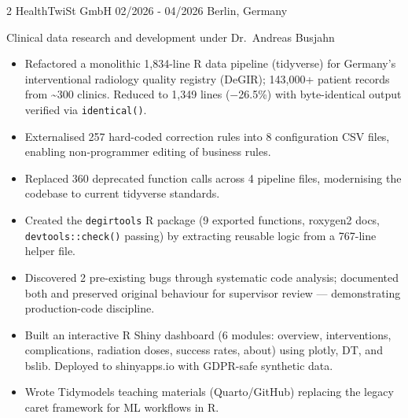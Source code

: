 \documentclass{thejus_cv}
\begin{document}
\begin{paracol}{2}
             {HealthTwiSt GmbH}
             {02/2026 - 04/2026}
             {Berlin, Germany}
             {Clinical data research and development under Dr.~Andreas Busjahn
             \begin{itemize}\setlength{\itemsep}{0.05em}
                   \item Refactored a monolithic 1,834-line R data pipeline (tidyverse) for Germany's interventional radiology quality registry (DeGIR); 143,000+ patient records from \textasciitilde300 clinics. Reduced to 1,349 lines ($-$26.5\%) with byte-identical output verified via \texttt{identical()}.
                   \item Externalised 257 hard-coded correction rules into 8 configuration CSV files, enabling non-programmer editing of business rules.
                   \item Replaced 360 deprecated function calls across 4 pipeline files, modernising the codebase to current tidyverse standards.
                   \item Created the \texttt{degirtools} R package (9 exported functions, roxygen2 docs, \texttt{devtools::check()} passing) by extracting reusable logic from a 767-line helper file.
                   \item Discovered 2 pre-existing bugs through systematic code analysis; documented both and preserved original behaviour for supervisor review --- demonstrating production-code discipline.
                   \item Built an interactive R Shiny dashboard (6 modules: overview, interventions, complications, radiation doses, success rates, about) using plotly, DT, and bslib. Deployed to shinyapps.io with GDPR-safe synthetic data.
                   \item Wrote Tidymodels teaching materials (Quarto/GitHub) replacing the legacy caret framework for ML workflows in R.
               \end{itemize}}


\end{paracol}
\end{document}
